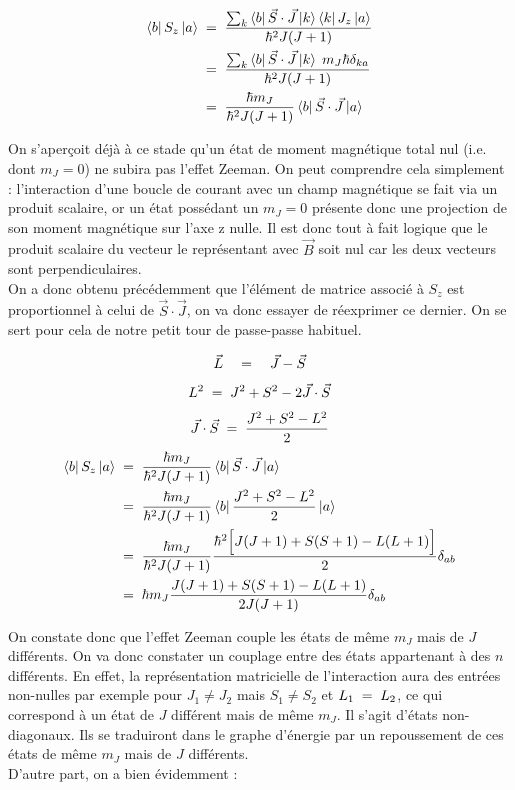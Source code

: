 \begin{align*}
    \bra{b}S_z\ket{a} 
    &\; = \;  
    \dfrac{\sum_k \bra{b}\vec{S}\cdot\vec{J}\ket{k}\bra{k}J_z\ket{a}}{\hbar^2 J(J+1)}\\
     &\; = \;  
    \dfrac{\sum_k \bra{b}\vec{S}\cdot\vec{J} \ket{k} \; m_J\hbar \delta_{ka}}{\hbar^2 J(J+1)}\\
    &\; = \;  
    \dfrac{\hbar m_J}{\hbar^2 J(J+1)} \bra{b}\vec{S}\cdot\vec{J}\ket{a}
\end{align*}

On s'aperçoit déjà à ce stade qu'un état de moment magnétique total nul (i.e. dont $m_J = 0$) ne subira pas l'effet Zeeman. On peut comprendre cela simplement : l'interaction d'une boucle de courant avec un champ magnétique se fait via un produit scalaire, or un état possédant un  $m_J = 0$ présente donc une projection de son moment magnétique sur l'axe z nulle. Il est donc tout à fait logique que le produit scalaire du vecteur le représentant avec $\vec{B}$ soit nul car les deux vecteurs sont perpendiculaires.\\
On a donc obtenu précédemment que l'élément de matrice associé à $S_z$ est proportionnel à celui de $\vec{S}\cdot\vec{J}$, on va donc essayer de réexprimer ce dernier. On se sert pour cela de notre petit tour de passe-passe habituel.

\begin{equation*}
    \vec{L} \quad = \quad \vec{J} - \vec{S}
\end{equation*}
\begin{equation*}
    L^2 \; = \; J^2 + S^2 - 2\vec{J}\cdot \vec{S}
\end{equation*}
\begin{equation*}
    \vec{J}\cdot \vec{S} \; = \; \dfrac{J^2 + S^2 - L^2}{2}
\end{equation*}
\begin{align*}
    \bra{b}S_z\ket{a} 
    &\; = \; 
    \dfrac{\hbar m_J}{\hbar^2 J(J+1)} \bra{b}\vec{S}\cdot\vec{J}\ket{a}\\
    &\; = \;
    \dfrac{\hbar m_J}{\hbar^2 J(J+1)} \bra{b}  \dfrac{J^2 + S^2 - L^2}{2}  \ket{a}\\
    &\; = \;
    \dfrac{\hbar m_J}{\hbar^2 J(J+1)} \dfrac{\hbar^2 \Big[J(J+1) + S(S+1) - L(L+1) \Big]}{2}\delta_{ab}\\
    &\; = \;
    \hbar m_J \dfrac{J(J+1) + S(S+1) - L(L+1) }{2J(J+1)} \delta_{ab}
\end{align*}

On constate donc que l'effet Zeeman couple les états de même $m_J$ mais de $J$ différents. On va donc constater un couplage entre des états appartenant à des $n$ différents. En effet, la représentation matricielle de l'interaction aura des entrées non-nulles par exemple pour $J_1\neq J_2$ mais $S_1\neq S_2$ et $L_1 \; = \; L_2$, ce qui correspond à un état de $J$ différent mais de même $m_J$. Il s'agit d'états non-diagonaux. Ils se traduiront dans le graphe d'énergie par un repoussement de ces états de même $m_J$ mais de $J$ différents.\\
D'autre part, on a bien évidemment :

